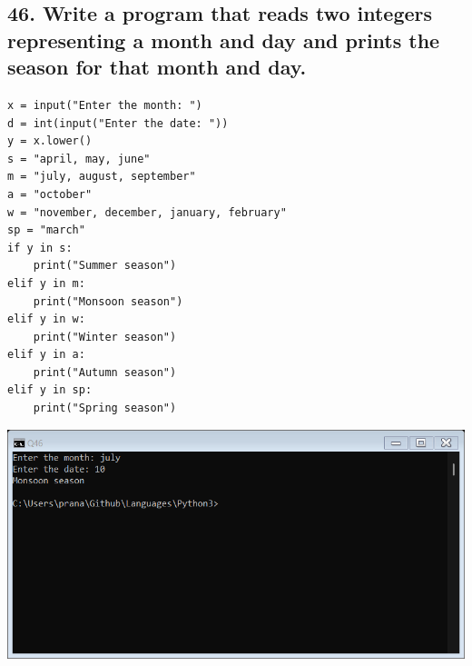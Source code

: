 \documentclass[12pt]{article}
\begin{document}
\subsection*{46. Write a program that reads two integers representing a month and day and prints the season for that month and day.}
\begin{verbatim}
x = input("Enter the month: ")
d = int(input("Enter the date: "))
y = x.lower()
s = "april, may, june"
m = "july, august, september"
a = "october"
w = "november, december, january, february"
sp = "march"
if y in s:
    print("Summer season")
elif y in m:
    print("Monsoon season")
elif y in w:
    print("Winter season")
elif y in a:
    print("Autumn season")
elif y in sp:
    print("Spring season")
\end{verbatim}
\includegraphics[width=\linewidth]{images/46.png}
\end{document}
